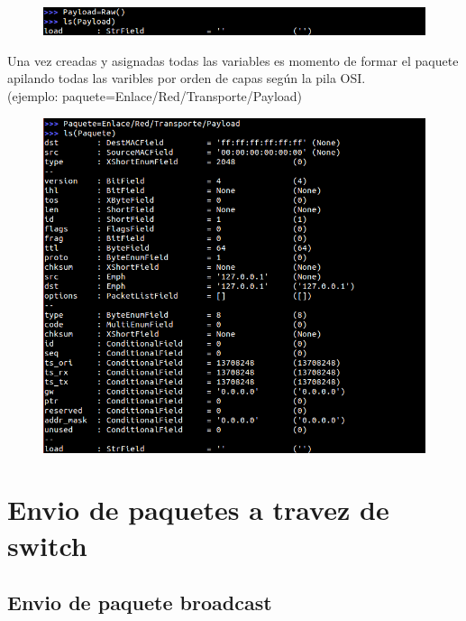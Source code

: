 \documentclass[spanish]{udpreport}
\begin{document}
\begin{figure}[H]
\begin{center}
\includegraphics[scale=0.7]{images/4.png}
\end{center}
\end{figure}

Una vez creadas y asignadas todas las variables es momento de formar el paquete apilando todas las varibles por orden de capas según la pila OSI.\\
(ejemplo: paquete=Enlace/Red/Transporte/Payload)

\begin{figure}[H]
\begin{center}
\includegraphics[scale=0.7]{images/5.png}
\end{center}
\end{figure}


\section{Envio de paquetes a travez de switch}
\subsection{Envio de paquete broadcast}
\end{document}
